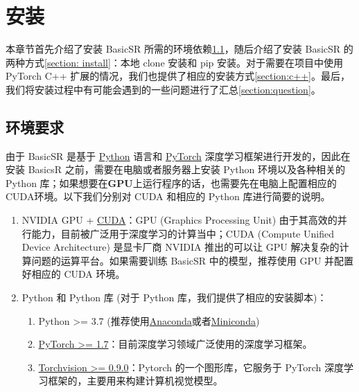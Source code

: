 \documentclass[../main.tex]{subfiles}
\begin{document}
\chapter{安装}
\vspace{-2cm}


本章节首先介绍了安装 BasicSR 所需的环境依赖\ref{section: env reqirement}，随后介绍了安装 BasicSR 的两种方式\ref{section: install}：本地 clone 安装和 pip 安装。对于需要在项目中使用 PyTorch C++ 扩展的情况，我们也提供了相应的安装方式\ref{section:c++}。最后，我们将安装过程中有可能会遇到的一些问题进行了汇总\ref{section:question}。

\section{环境要求}
\label{section: env reqirement}

由于 BasicSR 是基于 \href{https://www.python.org/}{Python} 语言和 \href{https://pytorch.org/}{PyTorch} 深度学习框架进行开发的，因此在安装 BasicsR 之前，需要在电脑或者服务器上安装 Python 环境以及各种相关的 Python 库；如果想要在\textbf{GPU}上运行程序的话，也需要先在电脑上配置相应的CUDA环境。以下我们分别对 CUDA 和相应的 Python 库进行简要的说明。

\begin{enumerate}
    \item NVIDIA GPU + \href{https://developer.nvidia.com/cuda-downloads}{CUDA}：GPU (Graphics Processing Unit) 由于其高效的并行能力，目前被广泛用于深度学习的计算当中；CUDA (Compute Unified Device Architecture) 是显卡厂商 NVIDIA 推出的可以让 GPU 解决复杂的计算问题的运算平台。如果需要训练 BasicSR 中的模型，推荐使用 GPU 并配置好相应的 CUDA 环境。

    \item Python 和 Python 库 (对于 Python 库，我们提供了相应的安装脚本)：
    \begin{enumerate}
        \item Python >= 3.7 (推荐使用\href{https://www.anaconda.com/products/distribution#linux}{Anaconda}或者\href{https://docs.conda.io/en/latest/miniconda.html}{Miniconda})
        \item \href{https://pytorch.org/}{PyTorch >= 1.7}：目前深度学习领域广泛使用的深度学习框架。
        \item \href{https://pytorch.org/}{Torchvision >= 0.9.0}：Pytorch 的一个图形库，它服务于 PyTorch 深度学习框架的，主要用来构建计算机视觉模型。
    \end{enumerate}
\end{enumerate}
\end{document}
